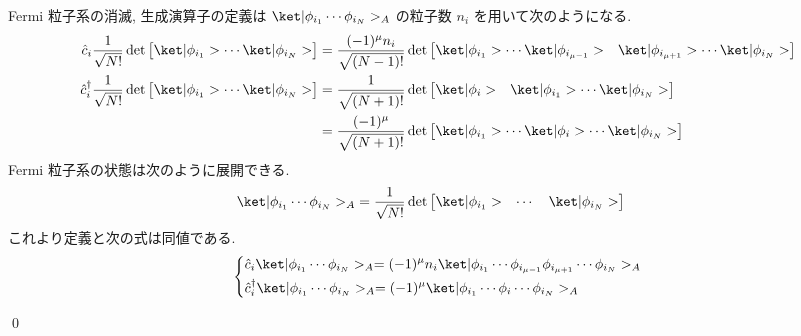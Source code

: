 \documentclass[uplatex,dvipdfmx,a4paper,11pt]{jlreq}
\makeatletter
\DeclareMathOperator{\Det}{det}
\numberwithin{equation}{section}
\theoremstyle{definition}
\renewenvironment{proof}[1][\proofname]{\par
  \normalfont
  \topsep6\p@\@plus6\p@ \trivlist
  \item[\hskip\labelsep{\bfseries #1}\@addpunct{\bfseries}]\ignorespaces\quad\par
}{
  \qed\endtrivlist\@endpefalse
}
\renewcommand\proofname{証明}
\makeatother
\begin{document}
\begin{proof}
  Fermi 粒子系の消滅, 生成演算子の定義は $\ket|\phi_{i_1}\cdots\phi_{i_N}>_A$ の粒子数 $n_i$ を用いて次のようになる.
  \begin{align}
    \hat{c}_i\frac{1}{\sqrt{N!}}\Det\begin{bmatrix}\ket|\phi_{i_1}> \cdots \ket|\phi_{i_N}>\end{bmatrix}         & = \frac{(-1)^\mu n_i}{\sqrt{(N-1)!}}\Det\begin{bmatrix}\ket|\phi_{i_1}> \cdots \ket|\phi_{i_{\mu-1}}> & \ket|\phi_{i_{\mu+1}}>\cdots\ket|\phi_{i_N}>\end{bmatrix} \\
    \hat{c}_i^\dagger\frac{1}{\sqrt{N!}}\Det\begin{bmatrix}\ket|\phi_{i_1}> \cdots \ket|\phi_{i_N}>\end{bmatrix} & = \frac{1}{\sqrt{(N+1)!}}\Det\begin{bmatrix}\ket|\phi_i> & \ket|\phi_{i_1}> \cdots \ket|\phi_{i_N}>\end{bmatrix}                                                                                            \\
                                                                                                                 & = \frac{(-1)^\mu}{\sqrt{(N+1)!}}\Det\begin{bmatrix}\ket|\phi_{i_1}> \cdots \ket|\phi_i> \cdots \ket|\phi_{i_N}>\end{bmatrix}
  \end{align}
  Fermi 粒子系の状態は次のように展開できる.
  \begin{align}
    \ket|\phi_{i_1}\cdots\phi_{i_N}>_A & = \frac{1}{\sqrt{N!}}\Det\begin{bmatrix}\ket|\phi_{i_1}> & \cdots & \ket|\phi_{i_N}>\end{bmatrix}
  \end{align}
  これより定義と次の式は同値である.
  \begin{align}
    \begin{dcases}
      \hat{c}_i\ket|\phi_{i_1}\cdots\phi_{i_N}>_A = (-1)^\mu n_i\ket|\phi_{i_1}\cdots\phi_{i_{\mu-1}}\phi_{i_{\mu+1}}\cdots\phi_{i_N}>_A \\
      \hat{c}_i^\dagger\ket|\phi_{i_1}\cdots\phi_{i_N}>_A = (-1)^\mu\ket|\phi_{i_1}\cdots\phi_i\cdots\phi_{i_N}>_A
    \end{dcases}
  \end{align}
\end{proof}
\end{document}
